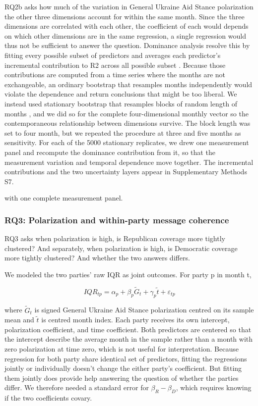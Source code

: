 RQ2b asks how much of the variation in General Ukraine Aid Stance polarization the other three dimensions account for within the same month. Since the three dimensions are correlated with each other, the coefficient of each would depends on which other dimensions are in the same regression, a single regression would thus not be sufficient to answer the question. Dominance analysis resolve this by fitting every possible subset of predictors and averages each predictor's incremental contribution to R2 across all possible subset \citep{budescuDominanceAnalysisNew1993}. Because those contributions are computed from a time series where the months are not exchangeable, an ordinary bootstrap that resamples months independently would violate the dependence and return conclusions that might be too liberal. We instead used stationary bootstrap that resamples blocks of random length of months \citep{politisStationaryBootstrap1994}, and we did so for the complete four-dimensional monthly vector so the contemporaneous relationship between dimensions survive. The block length was set to four month, but we repeated the procedure at three and five months as sensitivity. For each of the 5000 stationary replicates, we drew one measurement panel and recompute the dominance contribution from it, so that the measurement variation and temporal dependence move together. The incremental contributions and the two uncertainty layers appear in Supplementary Methods S7.

with one complete measurement panel.

\subsubsection{RQ3: Polarization and within-party message coherence}

RQ3 asks when polarization is high, is Republican coverage more tightly clustered? And separately, when polarization is high, is Democratic coverage more tightly clustered? And whether the two answers differs.

We modeled the two parties' raw IQR as joint outcomes. For party p in month t,

\[IQR_{tp} = \alpha_{p} + \beta_{p}\widetilde{G}_{t} + \gamma_{p}\widetilde{t} + \varepsilon_{tp}\]

where $\widetilde{G}_{t}$ is signed General Ukraine Aid Stance polarization centred on its sample mean and $\widetilde{t}$ is centred month index. Each party receives its own intercept, polarization coefficient, and time coefficient. Both predictors are centered so that the intercept describe the average month in the sample rather than a month with zero polarization at time zero, which is not useful for interpretation. Because regression for both party share identical set of predictors, fitting the regressions jointly or individually doesn't change the either party's coefficient. But fitting them jointly does provide help answering the question of whether the parties differ. We therefore needed a standard error for $\beta_{R} - \beta_{D}$, which requires knowing if the two coefficients covary.

